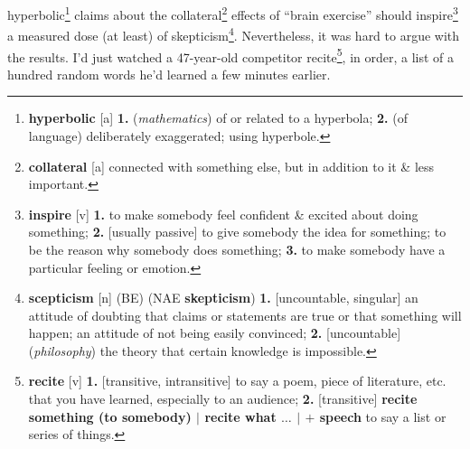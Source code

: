 \documentclass[oneside]{book}
\numberwithin{equation}{section}
\begin{document}
hyperbolic\footnote{\textbf{hyperbolic} [a] \textbf{1.} (\textit{mathematics}) of or related to a hyperbola; \textbf{2.} (of language) deliberately exaggerated; using hyperbole.} claims about the collateral\footnote{\textbf{collateral} [a] connected with something else, but in addition to it \& less important.} effects of ``brain exercise'' should inspire\footnote{\textbf{inspire} [v] \textbf{1.} to make somebody feel confident \& excited about doing something; \textbf{2.} [usually passive] to give somebody the idea for something; to be the reason why somebody does something; \textbf{3.} to make somebody have a particular feeling or emotion.} a measured dose (at least) of skepticism\footnote{\textbf{scepticism} [n] (BE) (NAE \textbf{skepticism}) \textbf{1.} [uncountable, singular] an attitude of doubting that claims or statements are true or that something will happen; an attitude of not being easily convinced; \textbf{2.} [uncountable] (\textit{philosophy}) the theory that certain knowledge is impossible.}. Nevertheless, it was hard to argue with the results. I'd just watched a 47-year-old competitor recite\footnote{\textbf{recite} [v] \textbf{1.} [transitive, intransitive] to say a poem, piece of literature, etc. that you have learned, especially to an audience; \textbf{2.} [transitive] \textbf{recite something (to somebody) $|$ recite what $\ldots$ $|$ $+$ speech} to say a list or series of things.}, in order, a list of a hundred random words he'd learned a few minutes earlier.
\end{document}
